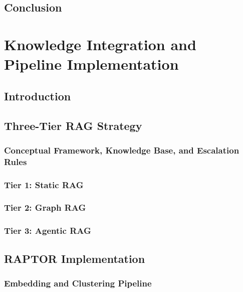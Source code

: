 \documentclass[12pt,a4paper]{report}
\begin{document}
\section{Conclusion}
\label{sec:ch4-conclusion}


\chapter{Knowledge Integration and Pipeline Implementation}
\label{ch:implementation}

\section{Introduction}
\label{sec:ch5-intro}

\section{Three-Tier RAG Strategy}
\label{sec:rag-impl}

  \subsection{Conceptual Framework, Knowledge Base, and Escalation Rules}
  \label{subsec:rag-framework}

  \subsection{Tier 1: Static RAG}
  \label{subsec:static-rag-impl}

  \subsection{Tier 2: Graph RAG}
  \label{subsec:graph-rag-impl}

  \subsection{Tier 3: Agentic RAG}
  \label{subsec:agentic-rag-impl}

\section{RAPTOR Implementation}
\label{sec:raptor-impl}

  \subsection{Embedding and Clustering Pipeline}
  \label{subsec:embedding-clustering}
\end{document}
